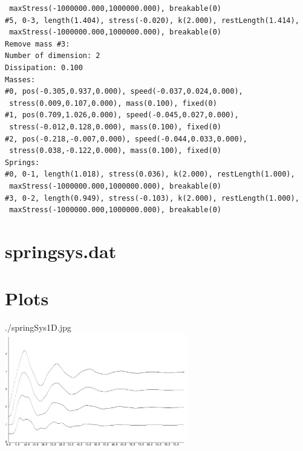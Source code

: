 \documentclass[12pt, a4paper]{article}
\begin{document}
\begin{scriptsize}
\begin{ttfamily}
\begin{lstlisting}
 maxStress(-1000000.000,1000000.000), breakable(0)
#5, 0-3, length(1.404), stress(-0.020), k(2.000), restLength(1.414),
 maxStress(-1000000.000,1000000.000), breakable(0)
Remove mass #3:
Number of dimension: 2
Dissipation: 0.100
Masses:
#0, pos(-0.305,0.937,0.000), speed(-0.037,0.024,0.000),
 stress(0.009,0.107,0.000), mass(0.100), fixed(0)
#1, pos(0.709,1.026,0.000), speed(-0.045,0.027,0.000),
 stress(-0.012,0.128,0.000), mass(0.100), fixed(0)
#2, pos(-0.218,-0.007,0.000), speed(-0.044,0.033,0.000),
 stress(0.038,-0.122,0.000), mass(0.100), fixed(0)
Springs:
#0, 0-1, length(1.018), stress(0.036), k(2.000), restLength(1.000),
 maxStress(-1000000.000,1000000.000), breakable(0)
#3, 0-2, length(0.949), stress(-0.103), k(2.000), restLength(1.000),
 maxStress(-1000000.000,1000000.000), breakable(0)
\end{lstlisting}
\end{ttfamily}
\end{scriptsize}

\section{springsys.dat}

\begin{scriptsize}
\begin{ttfamily}

\end{ttfamily}
\end{scriptsize}
\newpage
\section{Plots}

\begin{center}
./springSys1D.jpg\\
\includegraphics[width=8cm]{./springSys1D.jpg}
\end{center} 
\end{document}
